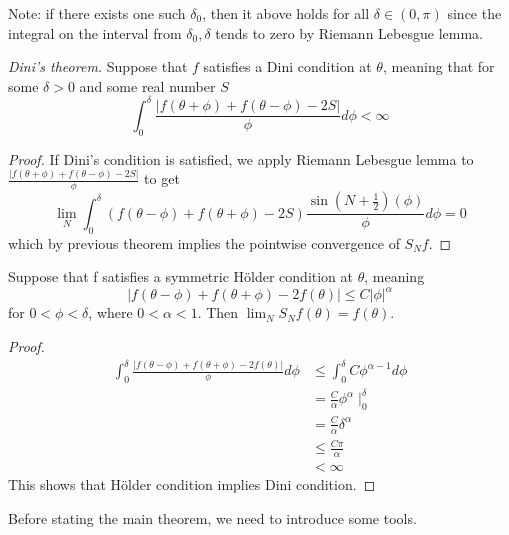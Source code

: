 \documentclass[12pt]{article}
\newenvironment{theorem}[1][Theorem.]{\begin{trivlist}
\item[\hskip \labelsep {\bfseries #1}]}{\end{trivlist}}
\newenvironment{corollary}[1][Corollary.]{\begin{trivlist}
\item[\hskip \labelsep {\bfseries #1}]}{\end{trivlist}}
\begin{document}
Note: if there exists one such $\delta_0$, then it above holds for all $\delta \in (0,\pi)$ since the integral on the interval from $\delta_0,\delta$ tends to zero by Riemann Lebesgue lemma.
\begin{theorem} \textit{Dini's theorem.}
Suppose that $f$ satisfies a Dini condition at $\theta$, meaning that for some $\delta > 0$ and some real number $S$
\[
\int_0^{\delta}\frac{|f(\theta+\phi)+f(\theta-\phi)-2S|}{\phi}d\phi < \infty
\]
\end{theorem}
\begin{proof}
If Dini's condition is satisfied, we apply Riemann Lebesgue lemma to $\frac{|f(\theta+\phi)+f(\theta-\phi)-2S|}{\phi}$ to get  \[
\lim\limits _{N}\int_{0}^{\delta}(f(\theta -\phi)+f(\theta +\phi) - 2S)\frac{\sin(N+\frac{1}{2})(\phi)}{\phi}d\phi  = 0
\]
which by previous theorem implies the pointwise convergence of $S_Nf$.
\end{proof}
\begin{corollary}
Suppose that f satisfies a symmetric Hölder condition at $\theta$, meaning
\[
|f(\theta -\phi)+f(\theta +\phi)-2f(\theta)| \leqslant C|\phi|^{\alpha}
\]
for $0<\phi<\delta$, where $0<\alpha<1$. Then $\lim_NS_Nf(\theta)=f(\theta)$.
\end{corollary}
\begin{proof}
\begin{align*}
\int_0^{\delta}\frac{|f(\theta -\phi)+f(\theta +\phi)-2f(\theta)|}{\phi}d\phi &\leqslant \int_0^{\delta}C\phi^{\alpha - 1}d\phi\\
& =\frac{C}{\alpha}\phi^\alpha\mid_{0}^{\delta}\\
& =\frac{C}{\alpha}\delta^\alpha\\
& \leqslant \frac{C\pi}{\alpha}\\
& < \infty
\end{align*}
This shows that Hölder condition implies Dini condition.
\end{proof}
Before stating the main theorem, we need to introduce some tools.\\
\end{document}

